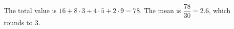 The total value is $16+8\cdot3+4\cdot5+2\cdot9=78$. The mean is $\dfrac{78}{30}=2.6$, which rounds to $\boxed3$.
